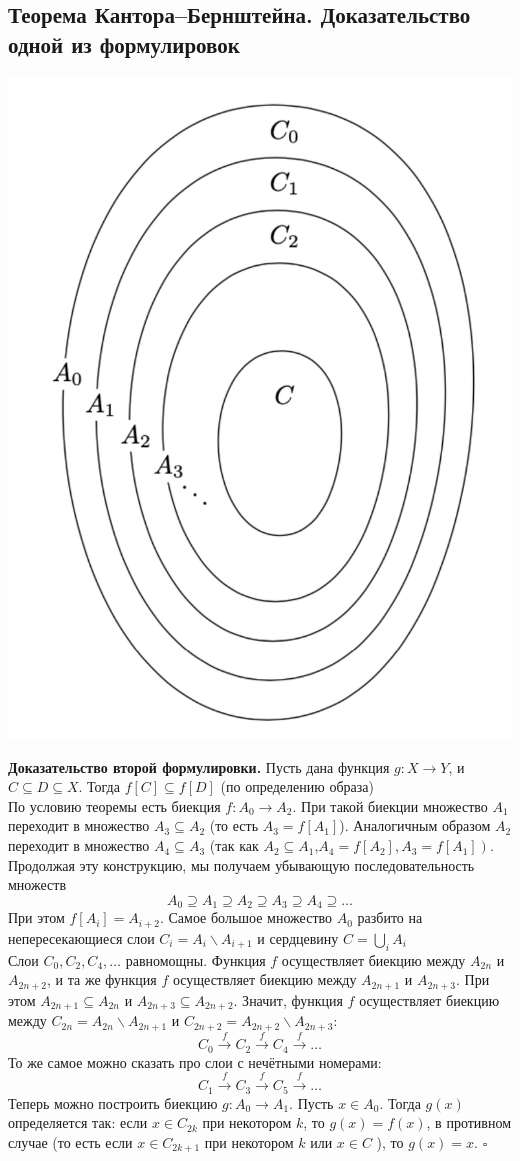 \documentclass[a4paper]{article}
\newcommand{\qed}{\hfill$\square$}
\begin{document}
\subsection{Теорема Кантора–Бернштейна. Доказательство одной из формулировок}
\begin{center}
    \includegraphics[width=0.5\linewidth]{Cantor.png}
\end{center}
\indent\textbf{Доказательство второй формулировки.} Пусть дана функция $g: X \rightarrow Y$, и $C \subseteq D \subseteq X$. Тогда $f[C] \subseteq f[D]$ (по определению образа)\\[2mm]
\indent По условию теоремы есть биекция $f: A_{0} \rightarrow A_{2}$. При такой биекции множество $A_{1}$ переходит в множество $A_{3} \subseteq A_{2}$ (то есть $A_{3}=f\left[A_{1}\right]$). Аналогичным образом $A_{2}$ переходит в множество $A_{4} \subseteq A_{3}$ (так как $A_{2} \subseteq A_{1}$,$\left.A_{4}=f\left[A_{2}\right], A_{3}=f\left[A_{1}\right]\right)$. Продолжая эту конструкцию, мы получаем убывающую последовательность множеств\\[2mm]
$$
A_{0} \supseteq A_{1} \supseteq A_{2} \supseteq A_{3} \supseteq A_{4} \supseteq \ldots
$$
\indent При этом $f\left[A_{i}\right]=A_{i+2}$. Самое большое множество $A_{0}$ разбито на непересекающиеся слои $C_{i}=A_{i} \backslash A_{i+1}$ и сердцевину $C=\bigcup_{i} A_{i}$\\[2mm]
\indent Слои $C_{0}, C_{2}, C_{4}, \ldots$ равномощны. Функция $f$ осуществляет биекцию между $A_{2 n}$ и $A_{2 n+2}$, и та же функция $f$ осуществляет биекцию между $A_{2 n+1}$ и $A_{2 n+3}$. При этом $A_{2 n+1} \subseteq A_{2 n}$ и $A_{2 n+3} \subseteq A_{2 n+2}$. Значит, функция $f$ осуществляет биекцию между $C_{2 n}=A_{2 n} \backslash A_{2 n+1}$ и $C_{2 n+2}=A_{2 n+2} \backslash A_{2 n+3}$:
$$
C_{0} \stackrel{f}{\longrightarrow} C_{2} \stackrel{f}{\longrightarrow} C_{4} \stackrel{f}{\longrightarrow} \ldots
$$
\indent То же самое можно сказать про слои с нечётными номерами:
$$
C_{1} \stackrel{f}{\longrightarrow} C_{3} \stackrel{f}{\longrightarrow} C_{5} \stackrel{f}{\longrightarrow} \ldots
$$
\indent Теперь можно построить биекцию $g: A_{0} \rightarrow A_{1}$. Пусть $x \in A_{0}$. Тогда $g(x)$ определяется так: если $x \in C_{2 k}$ при некотором $k$, то $g(x)=f(x)$, в противном случае (то есть если $x \in C_{2 k+1}$ при некотором $k$ или $x \in C$ ), то $g(x)=x$. \qed
\end{document}
